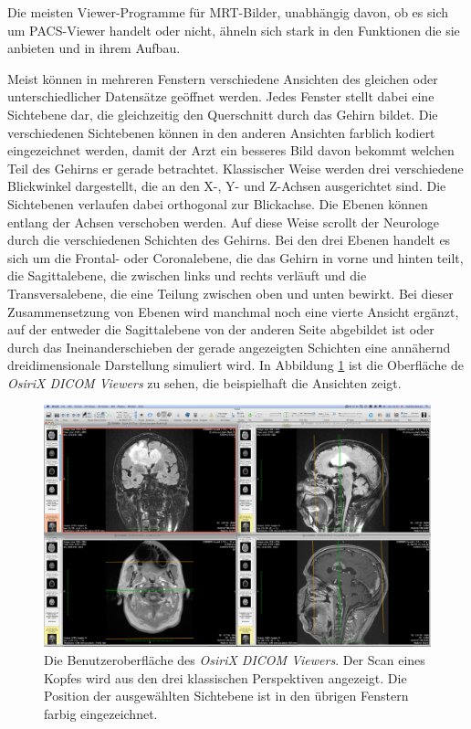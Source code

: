 Die meisten Viewer-Programme für MRT-Bilder, unabhängig davon, ob es sich um PACS-Viewer handelt oder nicht, ähneln sich stark in den Funktionen die sie anbieten und in ihrem Aufbau.

Meist können in mehreren Fenstern verschiedene Ansichten des gleichen oder unterschiedlicher Datensätze geöffnet werden. Jedes Fenster stellt dabei eine Sichtebene dar, die gleichzeitig den Querschnitt durch das Gehirn bildet. Die verschiedenen Sichtebenen können in den anderen Ansichten farblich kodiert eingezeichnet werden, damit der Arzt ein besseres Bild davon bekommt welchen Teil des Gehirns er gerade betrachtet.
Klassischer Weise werden drei verschiedene Blickwinkel dargestellt, die an den X-, Y- und Z-Achsen ausgerichtet sind. Die Sichtebenen verlaufen dabei orthogonal zur Blickachse. Die Ebenen können entlang der Achsen verschoben werden. Auf diese Weise scrollt der Neurologe durch die verschiedenen Schichten des Gehirns. 
Bei den drei Ebenen handelt es sich um die Frontal- oder Coronalebene, die das Gehirn in vorne und hinten teilt, die Sagittalebene, die zwischen links und rechts verläuft und die Transversalebene, die eine Teilung zwischen oben und unten bewirkt.  
Bei dieser Zusammensetzung von Ebenen wird manchmal noch eine vierte Ansicht ergänzt, auf der entweder die Sagittalebene von der anderen Seite abgebildet ist oder durch das Ineinanderschieben der gerade angezeigten Schichten eine annähernd dreidimensionale Darstellung simuliert wird. 
In Abbildung \ref{img:mrtSoftware} ist die Oberfläche de \textit{OsiriX DICOM Viewers} zu sehen, die beispielhaft die Ansichten zeigt.

\begin{figure}[!htb]
	\centering
	\includegraphics[width=0.7\linewidth]{images/osirix.jpg}
	\caption{Die Benutzeroberfläche des \textit{OsiriX DICOM Viewers}. Der Scan eines Kopfes wird aus den drei klassischen Perspektiven angezeigt. Die Position der ausgewählten Sichtebene ist in den übrigen Fenstern farbig eingezeichnet.}
	\label{img:mrtSoftware}
\end{figure}
\FloatBarrier

